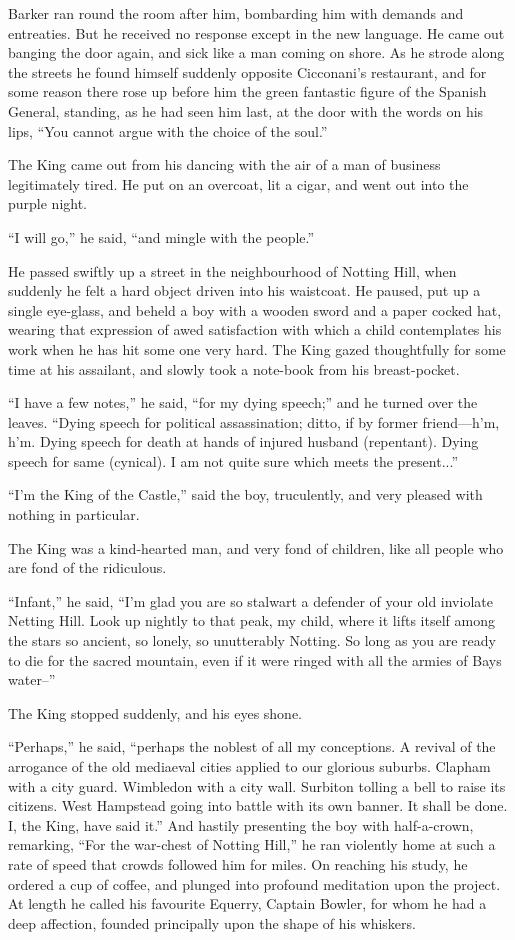 \documentclass{book}
\begin{document}
Barker ran round the room after him, bombarding him with demands and entreaties. But he received no response except in the new language. He came out banging the door again, and sick like a man coming on shore. As he strode along the streets he found himself suddenly opposite Cicconani’s restaurant, and for some reason there rose up before him the green fantastic figure of the Spanish General, standing, as he had seen him last, at the door with the words on his lips, “You cannot argue with the choice of the soul.”

The King came out from his dancing with the air of a man of business legitimately tired. He put on an overcoat, lit a cigar, and went out into the purple night.

“I will go,” he said, “and mingle with the people.”

He passed swiftly up a street in the neighbourhood of Notting Hill, when suddenly he felt a hard object driven into his waistcoat. He paused, put up a single eye-glass, and beheld a boy with a wooden sword and a paper cocked hat, wearing that expression of awed satisfaction with which a child contemplates his work when he has hit some one very hard. The King gazed thoughtfully for some time at his assailant, and slowly took a note-book from his breast-pocket.

“I have a few notes,” he said, “for my dying speech;” and he turned over the leaves. “Dying speech for political assassination; ditto, if by former friend—h’m, h’m. Dying speech for death at hands of injured husband (repentant). Dying speech for same (cynical). I am not quite sure which meets the present...”

“I’m the King of the Castle,” said the boy, truculently, and very pleased with nothing in particular.

The King was a kind-hearted man, and very fond of children, like all people who are fond of the ridiculous.

“Infant,” he said, “I’m glad you are so stalwart a defender of your old inviolate Netting Hill. Look up nightly to that peak, my child, where it lifts itself among the stars so ancient, so lonely, so unutterably Notting. So long as you are ready to die for the sacred mountain, even if it were ringed with all the armies of Bays water–”

The King stopped suddenly, and his eyes shone.

“Perhaps,” he said, “perhaps the noblest of all my conceptions. A revival of the arrogance of the old mediaeval cities applied to our glorious suburbs. Clapham with a city guard. Wimbledon with a city wall. Surbiton tolling a bell to raise its citizens. West Hampstead going into battle with its own banner. It shall be done. I, the King, have said it.” And hastily presenting the boy with half-a-crown, remarking, “For the war-chest of Notting Hill,” he ran violently home at such a rate of speed that crowds followed him for miles. On reaching his study, he ordered a cup of coffee, and plunged into profound meditation upon the project. At length he called his favourite Equerry, Captain Bowler, for whom he had a deep affection, founded principally upon the shape of his whiskers.
\end{document}

